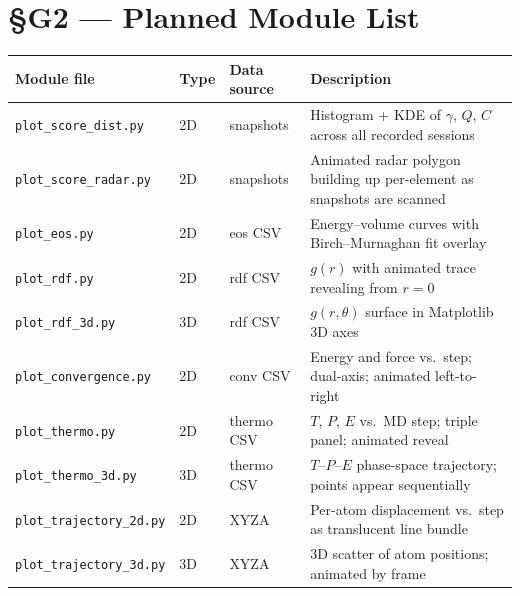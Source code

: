 \documentclass[11pt,a4paper]{article}
\begin{document}
\section{\S{}G2 --- Planned Module List}

\begin{center}
\begin{tabular}{lllp{5.2cm}}
\toprule
Module file & Type & Data source & Description \\
\midrule
\texttt{plot\_score\_dist.py}    & 2D & snapshots     & Histogram + KDE of $\gamma$, $Q$, $C$
                                                         across all recorded sessions \\
\texttt{plot\_score\_radar.py}   & 2D & snapshots     & Animated radar polygon building up
                                                         per-element as snapshots are scanned \\
\texttt{plot\_eos.py}            & 2D & eos CSV       & Energy--volume curves with
                                                         Birch--Murnaghan fit overlay \\
\texttt{plot\_rdf.py}            & 2D & rdf CSV       & $g(r)$ with animated trace
                                                         revealing from $r=0$ \\
\texttt{plot\_rdf\_3d.py}        & 3D & rdf CSV       & $g(r,\theta)$ surface in
                                                         Matplotlib 3D axes \\
\texttt{plot\_convergence.py}    & 2D & conv CSV      & Energy and force vs.\ step;
                                                         dual-axis; animated left-to-right \\
\texttt{plot\_thermo.py}         & 2D & thermo CSV    & $T$, $P$, $E$ vs.\ MD step;
                                                         triple panel; animated reveal \\
\texttt{plot\_thermo\_3d.py}     & 3D & thermo CSV    & $T$--$P$--$E$ phase-space trajectory;
                                                         points appear sequentially \\
\texttt{plot\_trajectory\_2d.py} & 2D & XYZA          & Per-atom displacement vs.\ step
                                                         as translucent line bundle \\
\texttt{plot\_trajectory\_3d.py} & 3D & XYZA          & 3D scatter of atom positions;
                                                         animated by frame \\

\end{tabular}
\end{center}
\end{document}
